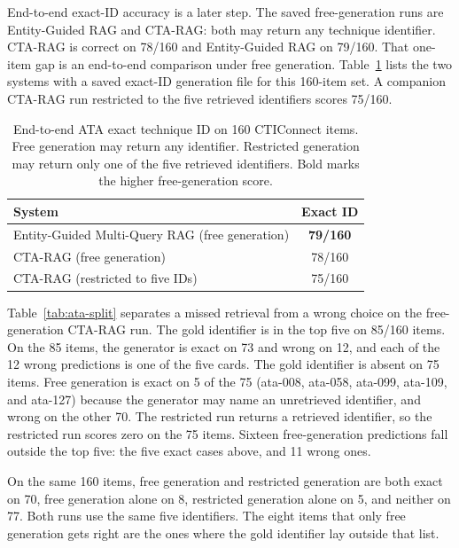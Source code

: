 \documentclass[5p,times,authoryear]{elsarticle}
\begin{document}
End-to-end exact-ID accuracy is a later step. The saved free-generation runs are Entity-Guided RAG and CTA-RAG: both may return any technique identifier. CTA-RAG is correct on 78/160 and Entity-Guided RAG on 79/160. That one-item gap is an end-to-end comparison under free generation. Table~\ref{tab:ata-e2e} lists the two systems with a saved exact-ID generation file for this 160-item set. A companion CTA-RAG run restricted to the five retrieved identifiers scores 75/160.

\begin{table}[t]
\centering
\small
\caption{End-to-end ATA exact technique ID on 160 CTIConnect items. Free generation may return any identifier. Restricted generation may return only one of the five retrieved identifiers. Bold marks the higher free-generation score.}
\label{tab:ata-e2e}
\begin{tabular}{@{}lc@{}}
\toprule
System & Exact ID \\
\midrule
Entity-Guided Multi-Query RAG (free generation) & \textbf{79/160} \\
CTA-RAG (free generation) & 78/160 \\
CTA-RAG (restricted to five IDs) & 75/160 \\
\bottomrule
\end{tabular}
\end{table}

Table~\ref{tab:ata-split} separates a missed retrieval from a wrong choice on the free-generation CTA-RAG run. The gold identifier is in the top five on 85/160 items. On the 85 items, the generator is exact on 73 and wrong on 12, and each of the 12 wrong predictions is one of the five cards. The gold identifier is absent on 75 items. Free generation is exact on 5 of the 75 (ata-008, ata-058, ata-099, ata-109, and ata-127) because the generator may name an unretrieved identifier, and wrong on the other 70. The restricted run returns a retrieved identifier, so the restricted run scores zero on the 75 items. Sixteen free-generation predictions fall outside the top five: the five exact cases above, and 11 wrong ones.

On the same 160 items, free generation and restricted generation are both exact on 70, free generation alone on 8, restricted generation alone on 5, and neither on 77. Both runs use the same five identifiers. The eight items that only free generation gets right are the ones where the gold identifier lay outside that list.
\end{document}
